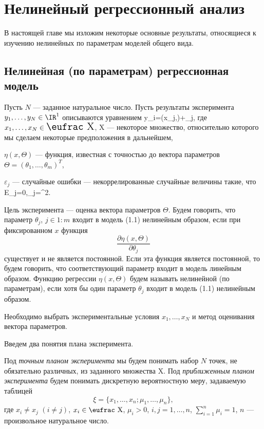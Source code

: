 

\chapter{Нелинейный регрессионный анализ}



В настоящей главе мы изложим некоторые основные результаты,
относящиеся к изучению нелинейных по параметрам моделей общего вида.


\section{\bf  Нелинейная (по параметрам) регрессионная модель}

Пусть $N$ --- заданное натуральное число. Пусть результаты
эксперимента $y_1,\ldots,y_N\in {\IR}^1$ описываются уравнением \beq
y_i=\eta(x_j,\Theta)+\varepsilon_j, \eeq где $x_1,\ldots,x_N\in
{\mbox{\rm{\Large{\eufrac X}}}}$, {\Large{\eufrac  X}} --- некоторое
множество, относительно которого мы сделаем некоторые предположения
в дальнейшем,

$\eta(x,\Theta)$ --- функция, известная с точностью до вектора
параметров $\Theta=(\theta_1,\ldots,\theta_m)^T$,

$\varepsilon_j$ --- случайные ошибки --- некоррелированные случайные
величины такие, что \beq E\varepsilon_j=0,\varepsilon_j=\sigma^2. \eeq

Цель эксперимента --- оценка вектора параметров $\Theta$. Будем
говорить, что параметр $\theta_j$, $j\in1:m$ входит в модель (1.1)
нелинейным образом, если при фиксированном $x$ функция
$$
\frac{\partial\eta(x,\Theta)}{\partial\theta_j}
$$
 существует и не является постоянной.
Если эта функция является постоянной, то будем говорить, что
соответствующий параметр входит в модель линейным образом. Функцию
регрессии $\eta(x,\Theta)$ будем называть нелинейной (по
параметрам), если хотя бы один параметр $\theta_j$ входит в модель
(1.1) нелинейным образом.

Необходимо выбрать экспериментальные условия $x_1,\ldots,x_N$ и
метод оценивания вектора параметров.

Введем два понятия плана эксперимента.

Под {\it точным планом эксперимента} мы будем понимать набор $N$
точек, не обязательно различных, из заданного множества {\eufrac X}.
Под {\it приближенным планом эксперимента} будем понимать дискретную
вероятностную меру, задаваемую таблицей
$$
\xi=\{x_1,\ldots,x_n;\mu_1,\ldots,\mu_n\},
$$
 где $x_i\ne x_j$ $(i\ne j)$, $x_i\in{\mbox{\eufrac X}}$, $\mu_i> 0$, $i,j=1,\ldots,n$,
$\sum^n_{i=1}\mu_i=1$, $n$ --- произвольное натуральное число.

